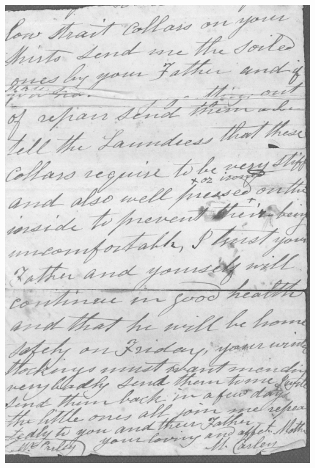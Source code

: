 \documentclass[12pt]{article}
\begin{document}
\includegraphics[width=\textwidth]{MCarley2.pdf}
\end{document}

